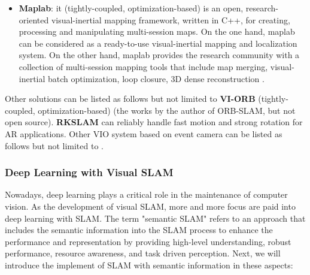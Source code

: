\documentclass[journal,transmag]{IEEEtran}
\begin{document}
\begin{itemize}
    \item \textbf{Maplab}: it (tightly-coupled, optimization-based) is an open, research-oriented visual-inertial mapping framework, written in C++, for creating, processing and manipulating multi-session maps. On the one hand, maplab can be considered as a ready-to-use visual-inertial mapping and localization system. On the other hand, maplab provides the research community with a collection of multi-session mapping tools that include map merging, visual-inertial batch optimization, loop closure, 3D dense reconstruction \cite{schneider2018maplab}.
\end{itemize}

Other solutions can be listed as follows but not limited to \textbf{VI-ORB} (tightly-coupled, optimization-based) \cite{mur2017visual} (the works by the author of ORB-SLAM, but not open source). \textbf{RKSLAM} \cite{liu2016robust} can reliably handle fast motion and strong rotation for AR applications. Other VIO system based on event camera can be listed as follows but not limited to \cite{mueggler2018continuous}\cite{zhu2017event}\cite{nelson2019event}.

\subsubsection{Deep Learning with Visual SLAM}
Nowadays, deep learning plays a critical role in the maintenance of computer vision. As the development of visual SLAM, more and more focus are paid into deep learning with SLAM. The term "semantic SLAM" refers to an approach that includes the semantic information into the SLAM process to enhance the performance and representation by providing high-level understanding, robust performance, resource awareness, and task driven perception. Next, we will introduce the implement of SLAM with semantic information in these aspects: 
\end{document}
